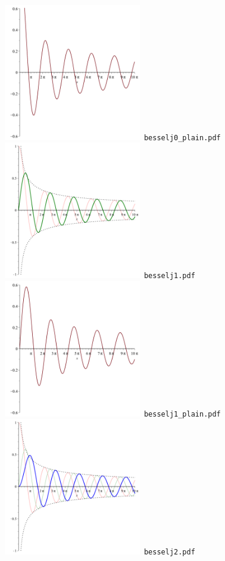 \documentclass[a4paper]{amsart}
\begin{document}
\includegraphics[width=6cm]{besselj0_plain.pdf}\verb+ besselj0_plain.pdf+\\
\includegraphics[width=6cm]{besselj1.pdf}\verb+ besselj1.pdf+\\
\includegraphics[width=6cm]{besselj1_plain.pdf}\verb+ besselj1_plain.pdf+\\
\includegraphics[width=6cm]{besselj2.pdf}\verb+ besselj2.pdf+\\
\end{document}
